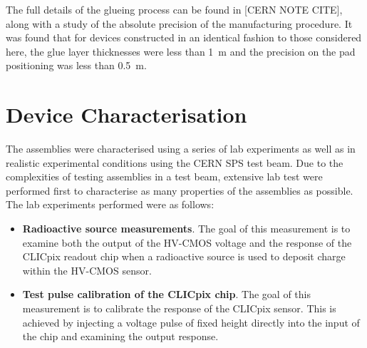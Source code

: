 The full details of the glueing process can be found in [CERN NOTE CITE], along with a study of the absolute precision of the manufacturing procedure.  It was found that for devices constructed in an identical fashion to those considered here, the glue layer thicknesses were less than 1~{\mu}m and the precision on the pad positioning was less than 0.5~{\mu}m.  


\section{Device Characterisation}


The assemblies were characterised using a series of lab experiments as well as in realistic experimental conditions using the CERN SPS test beam.  Due to the complexities of testing assemblies in a test beam, extensive lab test were performed first to characterise as many properties of the assemblies as possible.  The lab experiments performed were as follows:

\begin{itemize}
\item \textbf{Radioactive source measurements}.  The goal of this measurement is to examine both the output of the HV-CMOS voltage and the response of the CLICpix readout chip when a radioactive source is used to deposit charge within the HV-CMOS sensor.  
\item \textbf{Test pulse calibration of the CLICpix chip}.  The goal of this measurement is to calibrate the response of the CLICpix sensor.  This is achieved by injecting a voltage pulse of fixed height directly into the input of the chip and examining the output response.  
\end{itemize} 


